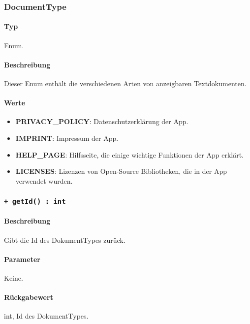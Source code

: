 \subsubsection{DocumentType}
\paragraph*{Typ}
Enum.
\paragraph*{Beschreibung}
Dieser Enum enthält die verschiedenen Arten von anzeigbaren Textdokumenten.

\paragraph*{Werte}
\begin{itemize}
    \item \textbf{PRIVACY\_POLICY}: Datenschutzerklärung der App.
    \item \textbf{IMPRINT}: Impressum der App.
    \item \textbf{HELP\_PAGE}: Hilfsseite, die einige wichtige Funktionen der App erklärt.
    \item \textbf{LICENSES}: Lizenzen von Open-Source Bibliotheken, die in der App verwendet wurden.
\end{itemize}

\subsubsection*{\texttt{+ getId() : int}}%
\paragraph*{Beschreibung}
Gibt die Id des DokumentTypes zurück.
\paragraph*{Parameter}
Keine.
\paragraph*{Rückgabewert}
int, Id des DokumentTypes.